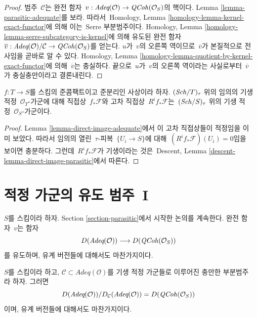 \begin{proof}
범주\  $\mathcal{C}$는 완전 함자\ 
$v : \textit{Adeq}(\mathcal{O}) \to \mathit{QCoh}(\mathcal{O}_S)$의 핵이다.
Lemma \ref{lemma-parasitic-adequate}를 보라. 따라서\  Homology, Lemma
\ref{homology-lemma-kernel-exact-functor}에 의해 이는\  Serre
부분범주이다. Homology, Lemma
\ref{homology-lemma-serre-subcategory-is-kernel}에 의해 유도된 완전 함자\ 
$\overline{v} :
\textit{Adeq}(\mathcal{O}) / \mathcal{C}
\to
\mathit{QCoh}(\mathcal{O}_S)$를 얻는다. $u$가\  $v$의 오른쪽 역이므로\ 
$\overline{v}$가 본질적으로 전사임을 곧바로 알 수 있다. Homology,
Lemma \ref{homology-lemma-quotient-by-kernel-exact-functor}에 의해\ 
$\overline{v}$는 충실하다. 끝으로\  $u$가\  $v$의 오른쪽 역이라는
사실로부터\  $\overline{v}$가 충실충만이라고 결론내린다.
\end{proof}

\begin{lemma}
\label{lemma-direct-image-parasitic-adequate}
$f : T \to S$를 스킴의 준콤팩트이고 준분리인 사상이라 하자.
$(\mathit{Sch}/T)_\tau$ 위의 임의의 기생 적정\  $\mathcal{O}_T$-가군에 대해
직접상\  $f_*\mathcal{F}$와 고차 직접상\  $R^if_*\mathcal{F}$는\ 
$(\mathit{Sch}/S)_\tau$ 위의 기생 적정\  $\mathcal{O}_S$-가군이다.
\end{lemma}

\begin{proof}
Lemma \ref{lemma-direct-image-adequate}에서 이 고차 직접상들이
적정임을 이미 보았다. 따라서 임의의 열린\  $\tau$-피복\ 
$\{U_i \to S\}$에 대해\  $(R^if_*\mathcal{F})(U_i) = 0$임을 보이면
충분하다. 그런데\  $R^if_*\mathcal{F}$가 기생이라는 것은\  Descent,
Lemma \ref{descent-lemma-direct-image-parasitic}에서 따른다.
\end{proof}













\section{적정 가군의 유도 범주\  I}
\label{section-comparison}


\noindent
$S$를 스킴이라 하자. Section \ref{section-parasitic}에서 시작한
논의를 계속한다. 완전 함자\  $v$는 함자
$$
D(\textit{Adeq}(\mathcal{O}))
\longrightarrow
D(\mathit{QCoh}(\mathcal{O}_S))
$$
를 유도하며, 유계 버전들에 대해서도 마찬가지이다.

\begin{lemma}
\label{lemma-quotient-easy}
$S$를 스킴이라 하고,
$\mathcal{C} \subset \textit{Adeq}(\mathcal{O})$를 기생 적정 가군들로
이루어진 충만한 부분범주라 하자. 그러면
$$
D(\textit{Adeq}(\mathcal{O}))/D_\mathcal{C}(\textit{Adeq}(\mathcal{O}))
= D(\mathit{QCoh}(\mathcal{O}_S))
$$
이며, 유계 버전들에 대해서도 마찬가지이다.
\end{lemma}

